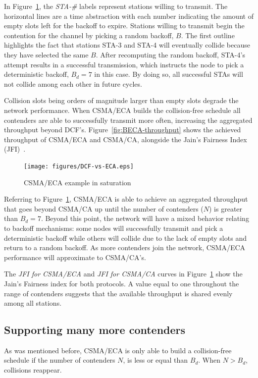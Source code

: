 \documentclass[a4paper,journal]{IEEEtran}
\begin{document}
In Figure~\ref{fig:BECA}, the \emph{STA-\#} labels represent stations willing to transmit. The horizontal lines are a time abstraction with each number indicating the amount of empty slots left for the backoff to expire. Stations willing to transmit begin the contention for the channel by picking a random backoff, $B$. The first outline highlights the fact that stations STA-3 and STA-4 will eventually collide because they have selected the same $B$. After recomputing the random backoff, STA-4's attempt results in a successful transmission, which instructs the node to pick a deterministic backoff, $B_{d}=7$ in this case. By doing so, all successful STAs will not collide among each other in future cycles.

Collision slots being orders of magnitude larger than empty slots degrade the network performance. When CSMA/ECA builds the collision-free schedule all contenders are able to successfully transmit more often, increasing the aggregated throughput beyond DCF's. Figure~\ref{fig:BECA-throughput} shows the achieved throughput of CSMA/ECA and CSMA/CA, alongside the Jain's Fairness Index (JFI)~\cite{JFI}.

\begin{figure}[htbp]
\centering
  \texttt{[image: figures/DCF-vs-ECA.eps]}
  \caption{CSMA/ECA example in saturation}
  \label{fig:BECA}
\end{figure}

Referring to Figure~\ref{fig:BECA}, CSMA/ECA is able to achieve an aggregated throughput that goes beyond CSMA/CA up until the number of contenders ($N$) is greater than $B_{d}=7$. Beyond this point, the network will have a mixed behavior relating to backoff mechanisms: some nodes will successfully transmit and pick a deterministic backoff while others will collide due to the lack of empty slots and return to a random backoff. As more contenders join the network, CSMA/ECA performance will approximate to CSMA/CA's.

The \emph{JFI for CSMA/ECA} and \emph{JFI for CSMA/CA} curves in Figure~\ref{fig:BECA} show the Jain's Fairness index for both protocols. A value equal to one throughout the range of contenders suggests that the available throughput is shared evenly among all stations.

	\subsection{Supporting many more contenders}
	As was mentioned before, CSMA/ECA is only able to build a collision-free schedule if the number of contenders $N$, is less or equal than $B_{d}$. When $N > B_{d}$, collisions reappear. 
	
\end{document}
